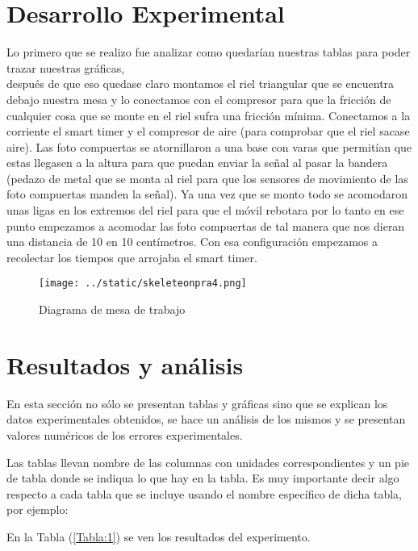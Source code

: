 \documentclass{article}
\begin{document}
\begin{multicols}{2}
\section*{Desarrollo Experimental}\label{Desarrollo experimental}				%

Lo primero que se realizo fue analizar como quedarían nuestras tablas para poder trazar nuestras gráficas,\\
después de que eso quedase claro montamos el riel triangular que se encuentra debajo nuestra mesa y lo conectamos con el compresor para que la fricción de cualquier cosa que se monte en el riel sufra una fricción mínima.
Conectamos a la corriente el smart timer y el compresor de aire (para comprobar que el riel sacase aire). Las foto compuertas se atornillaron a una base con varas que permitían que estas llegasen a la altura para que puedan enviar la señal al pasar la bandera (pedazo de metal que se monta al riel para que los sensores de movimiento de las foto compuertas manden la señal).  
Ya una vez que se monto todo se acomodaron unas ligas en los extremos del riel para que el móvil rebotara por lo tanto en ese punto empezamos a acomodar las foto compuertas de tal manera que nos dieran una distancia de 10 en 10 centímetros.
Con esa configuración empezamos a recolectar los tiempos que arrojaba el smart timer.  

\begin{figure}[H]
	\centering
	\texttt{[image: ../static/skeleteonpra4.png]}
	\caption{Diagrama de mesa de trabajo}
	\label{fig:1}
\end{figure}

\section*{Resultados y análisis}\label{Resultados}			%

En esta sección no sólo se presentan tablas y gráficas sino que se explican los datos experimentales obtenidos, se hace un análisis de los mismos y se presentan valores numéricos de los errores experimentales. 

Las tablas llevan nombre de las columnas con unidades correspondientes y un pie de tabla donde se indiqua lo que hay en la tabla. Es muy importante decir algo respecto a cada tabla que se incluye usando el nombre específico de dicha tabla, por ejemplo:

En la Tabla (\ref{Tabla:1}) se ven los resultados del experimento.


\end{multicols}
\end{document}
